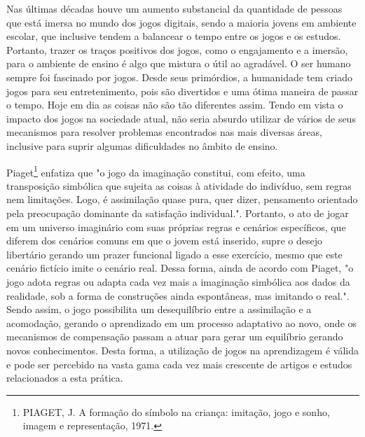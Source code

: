 \documentclass[
	12pt,				%
	openright,			%
	twoside,			%
	a4paper,			%
	english,			%
	french,				%
	spanish,			%
	brazil				%
	]{abntex2}
\begin{document}
Nas últimas décadas houve um aumento substancial da quantidade de pessoas que está imersa no mundo dos jogos digitais, sendo a maioria jovens em ambiente escolar, que inclusive tendem a balancear o tempo entre os jogos e os estudos. Portanto, trazer os traços positivos dos jogos, como o engajamento e a imersão, para o ambiente de ensino é algo que mistura o útil ao agradável. O ser humano sempre foi fascinado por jogos. Desde seus primórdios, a humanidade tem criado jogos para seu entretenimento, pois são divertidos e uma ótima maneira de passar o tempo. Hoje em dia as coisas não são tão diferentes assim. Tendo em vista o impacto dos jogos na sociedade atual, não seria absurdo utilizar de vários de seus mecanismos para resolver problemas encontrados nas mais diversas áreas, inclusive para suprir algumas dificuldades no âmbito de ensino.
    
Piaget\footnote{PIAGET, J. A formação do símbolo na criança: imitação, jogo e sonho, imagem e representação, 1971.} enfatiza que "o jogo da imaginação constitui, com efeito, uma transposição simbólica que sujeita as coisas à atividade do indivíduo, sem regras nem limitações. Logo, é assimilação quase pura, quer dizer, pensamento orientado pela preocupação dominante da satisfação individual.". Portanto, o ato de jogar em um universo imaginário com suas próprias regras e cenários específicos, que diferem dos cenários comuns em que o jovem está inserido, supre o desejo libertário gerando um prazer funcional ligado a esse exercício, mesmo que este cenário fictício imite o cenário real. Dessa forma, ainda de acordo com Piaget, "o jogo adota regras ou adapta cada vez mais a imaginação simbólica aos dados da realidade, sob a forma de construções ainda espontâneas, mas imitando o real.". Sendo assim, o jogo possibilita um desequilíbrio entre a assimilação e a acomodação, gerando o aprendizado em um processo adaptativo ao novo, onde os mecanismos de compensação passam a atuar para gerar um equilíbrio gerando novos conhecimentos. Desta forma, a utilização de jogos na aprendizagem é válida e pode ser percebido na vasta gama cada vez mais crescente de artigos e estudos relacionados a esta prática. 
\end{document}
